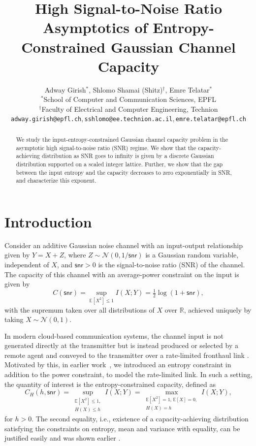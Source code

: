 \documentclass[11pt]{article}
\title{High Signal-to-Noise Ratio Asymptotics of Entropy-Constrained Gaussian 
	Channel Capacity}
\author{%
	Adway Girish$^*$, Shlomo Shamai (Shitz)$^\dagger$, Emre Telatar$^*$ \\
	{\small    $^*$School of Computer and Communication Sciences, EPFL}\\
	{\small    $^\dagger$Faculty of Electrical and Computer Engineering, Technion}\\
	{\small   \texttt{adway.girish@epfl.ch},\,\texttt{sshlomo@ee.technion.ac.il},\,\texttt{emre.telatar@epfl.ch}}
}
\newcommand{\calN}{\mathcal{N}}
\newcommand{\snr}{\mathsf{snr}}
\newcommand{\bbE}{\mathbb{E}}
\newcommand{\bbR}{\mathbb{R}}
\begin{document}
	
	
	
	\maketitle
	
	\begin{abstract}
		We study the input-entropy-constrained Gaussian channel capacity problem in 
		the asymptotic
		high signal-to-noise ratio (SNR) regime. 
		We show that the capacity-achieving distribution as SNR goes to 
		infinity is given by a discrete Gaussian distribution supported on a 
		scaled integer lattice.  Further, we show that the gap between the input entropy and the capacity decreases to zero exponentially in SNR, and characterize this exponent.
	\end{abstract}
	
	
	\section{Introduction}
	
	
	Consider an additive Gaussian noise channel with an input-output relationship given by $Y = X + Z$, where $Z \sim \calN(0,1/\snr)$ is a Gaussian random variable, independent of $X$, and $\snr > 0$ is the signal-to-noise ratio (SNR) of the channel.  The capacity of this channel with an average-power constraint on the input is given by
	\begin{equation*}
		C(\snr) = \sup_{\bbE[X^2] \leq 1} I(X; Y) = \tfrac12 \log ( 1 + \snr),
	\end{equation*}
	with the supremum taken over all distributions of $X$ over $\bbR$, achieved uniquely by taking $X \sim \calN(0,1)$. 
	

In modern cloud-based communication systems, the channel input is not generated directly at the transmitter but is instead produced or selected by a remote agent and conveyed to the transmitter over a rate-limited fronthaul link \cite{fronthaul}. Motivated by this, in earlier work~\cite{girish2025lowsnr}, we introduced an entropy constraint in addition to the power constraint, to model the rate-limited link.
In such a setting, the quantity of interest is the entropy-constrained capacity, defined as 
	\begin{equation}
		C_H(h, \snr) = \sup_{\substack{\bbE[X^2] \leq 1,\\H(X) \leq h}} I(X; Y)
		= \max_{\substack{\bbE[X^2] = 1,\, \bbE[X]=0, \\H(X) = h}} I(X; Y), \label{eqn: C_H}
	\end{equation}
	for $h > 0$. The second equality, i.e., existence of a capacity-achieving distribution satisfying the constraints on entropy, mean and variance with equality, can be justified easily and was shown earlier \cite[Proposition~1]{girish2025lowsnr}.
	
\end{document}
